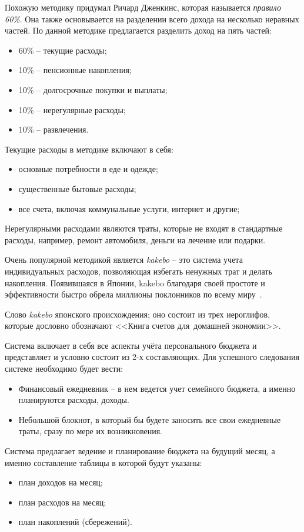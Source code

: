 Похожую методику придумал Ричард Дженкинс, которая называется \emph{правило 60\%}.
Она также основывается на разделении всего дохода на несколько неравных частей.
По данной методике предлагается разделить доход на пять частей:
\begin{itemize}
    \item 60\% -- текущие расходы;
    \item 10\% -- пенсионные накопления;
    \item 10\% -- долгосрочные покупки и выплаты;
    \item 10\% -- нерегулярные расходы;
    \item 10\% -- развлечения.
\end{itemize}

Текущие расходы в методике включают в себя:
\begin{itemize}
    \item основные потребности в еде и одежде;
    \item существенные бытовые расходы;
    \item все счета, включая коммунальные услуги, интернет и другие;
\end{itemize}

Нерегулярными расходами являются траты, которые не входят в стандартные расходы, например, ремонт автомобиля, деньги на лечение или подарки.

Очень популярной методикой является \emph{kakebo} -- это система учета индивидуальных расходов, позволяющая избегать ненужных трат и делать накопления.
Появившаяся в Японии, kakebo благодаря своей простоте и эффективности быстро обрела миллионы поклонников по всему миру~\cite{kakebo}.

Слово \emph{kakebo} японского происхождения; оно состоит из трех иероглифов, которые дословно обозначают <<Книга счетов для домашней экономии>>.

Система включает в себя все аспекты учёта персонального бюджета и представляет и условно состоит из 2-х составляющих.
Для успешного следования системе необходимо будет вести:
\begin{itemize}
    \item Финансовый ежедневник -- в нем ведется учет семейного бюджета, а именно планируются расходы, доходы.
    \item Небольшой блокнот, в который бы будете заносить все свои ежедневные траты, сразу по мере их возникновения.
\end{itemize}
Система предлагает ведение и планирование бюджета на будущий месяц, а именно составление таблицы в которой будут указаны:
\begin{itemize}
    \item план доходов на месяц;
    \item план расходов на месяц;
    \item план накоплений (сбережений).
\end{itemize}

